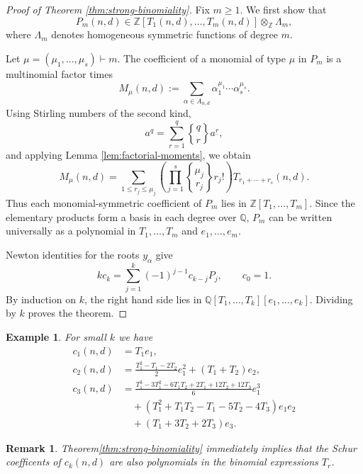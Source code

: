 \documentclass[10pt,a4paper]{amsart}
\numberwithin{equation}{section}
\newtheorem{remark}[theorem]{Remark}
\newtheorem{example}[theorem]{Example}
\newcommand{\Q}{\mathbb Q}
\newcommand{\Z}{\mathbb Z}
\newcommand{\StirTwo}[2]{\genfrac{\{} {\}}{0pt}{}{#1}{#2}}
\begin{document}
\begin{proof}[Proof of Theorem \ref{thm:strong-binomiality}]
Fix $m\ge1$.  We first show that
\begin{equation}\label{eq:P-m-in-ring}
  P_m(n,d)\in \Z[T_1(n,d),\ldots,T_m(n,d)]\otimes_{\Z}\Lambda_m,
\end{equation}
where $\Lambda_m$ denotes homogeneous symmetric functions of degree $m$.

Let $\mu=(\mu_1,\ldots,\mu_s)\vdash m$.  The coefficient of a monomial of type $\mu$ in $P_m$ is a multinomial factor times
\[
  M_\mu(n,d):=\sum_{\alpha\in A_{n,d}}\alpha_1^{\mu_1}\cdots\alpha_s^{\mu_s}.
\]
Using Stirling numbers of the second kind,
\[
  a^q=\sum_{r=1}^{q}\StirTwo{q}{r}a^{\underline r},
\]
and applying Lemma \ref{lem:factorial-moments}, we obtain
\begin{equation}\label{eq:mixed-moment}
  M_\mu(n,d)=
  \sum_{1\le r_j\le \mu_j}
  \left(\prod_{j=1}^s \StirTwo{\mu_j}{r_j}r_j!\right)
  T_{r_1+\cdots+r_s}(n,d).
\end{equation}
Thus each monomial-symmetric coefficient of $P_m$ lies in $\Z[T_1,\ldots,T_m]$.  Since the elementary products form a basis in each degree over $\Q$, $P_m$ can be written universally as a polynomial in $T_1,\ldots,T_m$ and $e_1,\ldots,e_m$.

Newton identities for the roots $y_\alpha$ give
\[
  k c_k=\sum_{j=1}^{k}(-1)^{j-1}c_{k-j}P_j,\qquad c_0=1.
\]
By induction on $k$, the right hand side lies in $\Q[T_1,\ldots,T_k][e_1,\ldots,e_k]$.  Dividing by $k$ proves the theorem.
\end{proof}
\begin{example} \label{ex:small-k-cknd} For small $k$ we have
\[\begin{aligned}
c_1(n,d)&=T_1e_1,\\[3pt]
c_2(n,d)&=
\frac{T_1^2-T_1-2T_2}{2}e_{1}^2
+(T_1+T_2)e_2,\\[3pt]
c_3(n,d)&=
\frac{T_1^3-3T_1^2-6T_1T_2+2T_1+12T_2+12T_3}{6}e_{1}^3\\
&\quad+
\left(T_1^2+T_1T_2-T_1-5T_2-4T_3\right)e_1e_2\\
&\quad+
\left(T_1+3T_2+2T_3\right)e_3.
\end{aligned}\]
\end{example}
\medskip
\begin{remark} \label{strong-binom4schur}
Theorem\ref{thm:strong-binomiality} immediately implies that the Schur coefficents of $c_k(n,d)$ are also polynomials in the binomial expressions $T_r$.
\end{remark}
\end{document}
